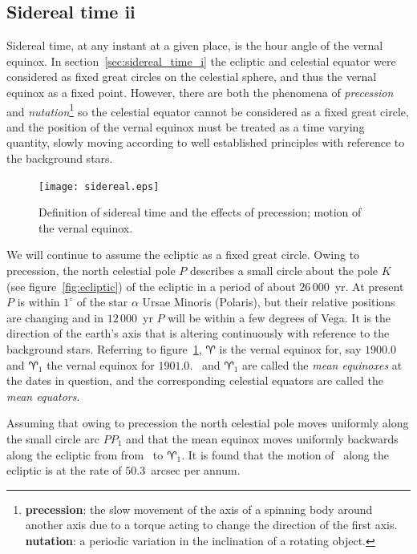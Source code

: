 \subsection{Sidereal time {\sc ii}}

Sidereal time, at any instant at a given place, is the hour angle of the vernal 
equinox. In section~\ref{sec:sidereal_time_i} the ecliptic and celestial equator were 
considered as fixed great circles on the celestial sphere, and thus the vernal
equinox as a fixed point. However, there are both the phenomena of {\it 
precession} and {\it nutation}\footnote{{\bf precession}: the slow movement of the axis of a spinning body around another axis due to a torque acting to change the direction of the first axis. {\bf nutation}: a periodic variation in the inclination of a rotating object.}  so the celestial equator cannot be considered 
as a fixed great circle, and the position of the vernal equinox must be treated as
a time varying quantity, slowly moving according to well established principles with
reference to the background stars.

\begin{figure}[h]
	\centering
	\texttt{[image: sidereal.eps]}
	\caption{Definition of sidereal time and the effects of precession; motion 
		of the vernal equinox. }
	\label{fig:sidereal}
\end{figure}

We will continue to assume the ecliptic as a fixed great circle. Owing to precession, 
the north celestial pole $P$ describes a small circle about the pole $K$ (see 
figure~\ref{fig:ecliptic}) of the ecliptic in a period of about $26\,000$~yr. At 
present $P$ is within $1^\circ$ of the star $\alpha$ Ursae Minoris (Polaris), but 
their relative positions are changing and in $12\,000$~yr  $P$ will be within a few
degrees of Vega. It is the direction of the earth's axis that is altering continuously 
with reference to the background stars. Referring to figure~\ref{fig:sidereal},
$\aries$ is the vernal equinox for, say $1900.0$ and $\aries_1$ the vernal equinox
for $1901.0$. \aries\ and $\aries_1$ are called the {\it mean equinoxes} at the dates
in question, and the corresponding celestial equators are called the 
{\it mean equators}. 

Assuming that owing to precession the north celestial pole moves uniformly along the 
small circle arc $PP_1$ and that the mean equinox moves uniformly backwards along the 
ecliptic from from \aries\  to $\aries_1$. It is found that the motion of \aries\  along
the ecliptic is at the rate of $50.3$~arcsec per annum.

